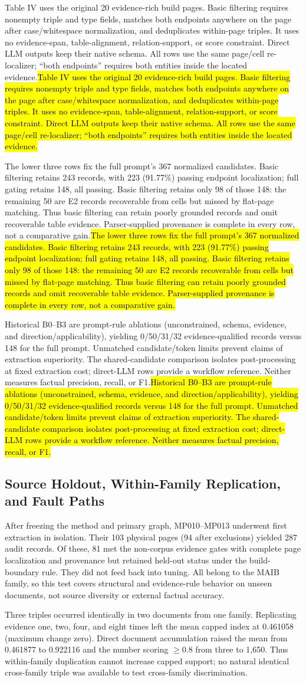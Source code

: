 \documentclass[conference,a4paper]{IEEEtran}
\DeclareRobustCommand{\rev}[1]{\ifdefined\CleanVersion#1\else\hl{#1}\fi}
\begin{document}
\rev{Table IV uses the original 20 evidence-rich build pages. Basic filtering requires nonempty triple and type fields, matches both endpoints anywhere on the page after case/whitespace normalization, and deduplicates within-page triples. It uses no evidence-span, table-alignment, relation-support, or score constraint. Direct LLM outputs keep their native schema. All rows use the same page/cell re-localizer; ``both endpoints'' requires both entities inside the located evidence.}

\rev{The lower three rows fix the full prompt's 367 normalized candidates. Basic filtering retains 243 records, with 223 (91.77\%) passing endpoint localization; full gating retains 148, all passing. Basic filtering retains only 98 of those 148: the remaining 50 are E2 records recoverable from cells but missed by flat-page matching. Thus basic filtering can retain poorly grounded records and omit recoverable table evidence. Parser-supplied provenance is complete in every row, not a comparative gain.}

\rev{Historical B0--B3 are prompt-rule ablations (unconstrained, schema, evidence, and direction/applicability), yielding 0/50/31/32 evidence-qualified records versus 148 for the full prompt. Unmatched candidate/token limits prevent claims of extraction superiority. The shared-candidate comparison isolates post-processing at fixed extraction cost; direct-LLM rows provide a workflow reference. Neither measures factual precision, recall, or F1.}

\subsection{Source Holdout, Within-Family Replication, and Fault Paths}

After freezing the method and primary graph, MP010--MP013 underwent first extraction in isolation. Their 103 physical pages (94 after exclusions) yielded 287 audit records. Of these, 81 met the non-corpus evidence gates with complete page localization and provenance but retained held-out status under the build-boundary rule. They did not feed back into tuning. All belong to the MAIB family, so this test covers structural and evidence-rule behavior on unseen documents, not source diversity or external factual accuracy.

Three triples occurred identically in two documents from one family. Replicating evidence one, two, four, and eight times left the mean capped index at 0.461058 (maximum change zero). Direct document accumulation raised the mean from 0.461877 to 0.922116 and the number scoring $\geq0.8$ from three to 1,650. Thus within-family duplication cannot increase capped support; no natural identical cross-family triple was available to test cross-family discrimination.
\end{document}
